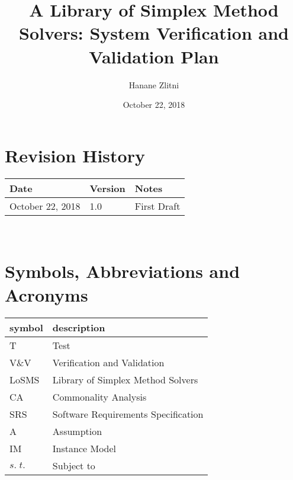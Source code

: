 \documentclass[12pt, titlepage]{article}
\newcommand{\famname}{LoSMS} %
\begin{document}
\title{A Library of Simplex Method Solvers: System Verification and Validation 
Plan} 
\author{Hanane Zlitni}
\date{October 22, 2018}
	
\maketitle


\section{Revision History}

\begin{tabularx}{\textwidth}{p{3cm}p{2cm}X}
\toprule {\bf Date} & {\bf Version} & {\bf Notes}\\
\midrule
October 22, 2018 & 1.0 & First Draft\\
\bottomrule
\end{tabularx}

~\newpage

\section{Symbols, Abbreviations and Acronyms}

\renewcommand{\arraystretch}{1.2}
\begin{tabular}{l l} 
  \toprule		
  \textbf{symbol} & \textbf{description}\\
  \midrule 
  T & Test\\
  V\&V & Verification and Validation\\
  \famname{} & Library of Simplex Method Solvers\\
  CA & Commonality Analysis\\
  SRS & Software Requirements Specification\\
  A & Assumption\\
  IM & Instance Model\\
  $s.\;t.$ & Subject to\\
  \bottomrule
\end{tabular}\\

\newpage

\tableofcontents

\listoftables

\listoffigures

\newpage

\end{document}

